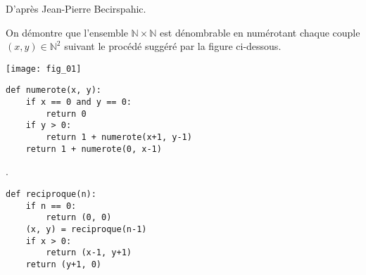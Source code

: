 \setcounter{numques}{0}

\begin{flushright}
\footnotesize{D'après Jean-Pierre Becirspahic.}
\end{flushright}



On démontre que l'ensemble $\mathbb{N}\times \mathbb{N}$ est dénombrable en numérotant chaque couple $(x,y)\in\mathbb{N}^2$ suivant le procédé suggéré par la figure ci-dessous.

\begin{center}
\texttt{[image: fig\_01]}
\end{center}

\ifprof
\begin{lstlisting}
def numerote(x, y):
    if x == 0 and y == 0:
        return 0
    if y > 0:
        return 1 + numerote(x+1, y-1)
    return 1 + numerote(0, x-1)
\end{lstlisting}
\else

\fi

.
\ifprof
\begin{lstlisting}
def reciproque(n):
    if n == 0:
        return (0, 0)
    (x, y) = reciproque(n-1)
    if x > 0:
        return (x-1, y+1)
    return (y+1, 0)
\end{lstlisting}
\else

\fi
